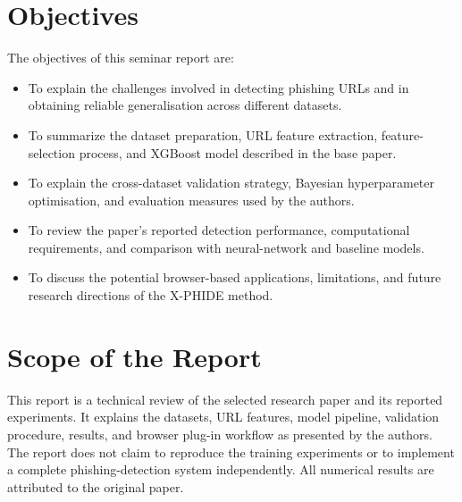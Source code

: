 \section{Objectives}
The objectives of this seminar report are:
\begin{itemize}
\item To explain the challenges involved in detecting phishing URLs and in obtaining reliable generalisation across different datasets.
\item To summarize the dataset preparation, URL feature extraction, feature-selection process, and XGBoost model described in the base paper.
\item To explain the cross-dataset validation strategy, Bayesian hyperparameter optimisation, and evaluation measures used by the authors.
\item To review the paper's reported detection performance, computational requirements, and comparison with neural-network and baseline models.
\item To discuss the potential browser-based applications, limitations, and future research directions of the X-PHIDE method.
\end{itemize}

\section{Scope of the Report}
This report is a technical review of the selected research paper and its reported experiments. It explains the datasets, URL features, model pipeline, validation procedure, results, and browser plug-in workflow as presented by the authors. The report does not claim to reproduce the training experiments or to implement a complete phishing-detection system independently. All numerical results are attributed to the original paper.\cite{bib1}
